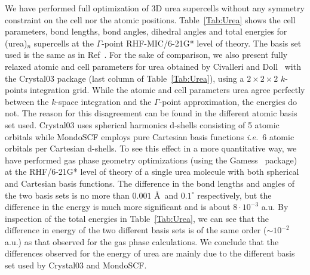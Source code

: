 \documentclass[prl,preprint,doublespace]{revtex4} %
\begin{document}
We have performed full optimization of 3D urea supercells 
without any symmetry constraint on the cell nor the atomic positions.
Table~\ref{Tab:Urea} shows the cell parameters, bond lengths, 
bond angles, dihedral angles and total energies
for (urea)$_n$ supercells at the $\Gamma$-point RHF-MIC/6-21G* level of
theory. The basis set used is the same as in Ref~\cite{RDovesi90}.
For the sake of comparison, we also present fully relaxed atomic and cell parameters
for urea obtained by Civalleri and Doll~\cite{BCivalleri05} with the 
{\sc Crystal03} package (last column of Table~\ref{Tab:Urea}), 
using a $2\times 2\times 2$ $k$-points integration grid.
While the atomic and cell parameters urea agree perfectly between the $k$-space integration
and the $\Gamma$-point approximation, the energies do not.
The reason for this disagreement can be found in the different atomic basis set used.
{\sc Crystal03} uses spherical harmonics d-shells consisting of 5 atomic orbitals 
while {\sc MondoSCF} employs pure Cartesian basis functions {\em i.e.}~6 atomic orbitals 
per Cartesian d-shells.
To see this effect in a more quantitative way, we have performed gas phase geometry optimizations 
(using the {\sc Gamess}~\cite{gamess} package) at the RHF/6-21G* level of theory 
of a single urea molecule with both spherical and Cartesian basis functions.
The difference in the bond lengths and angles of the two basis sets 
is no more than $0.001$ \AA~and $0.1^\circ$ respectively, but the
difference in the energy is much more significant and is about $8\cdot 10^{-3}$ a.u.
By inspection of the total energies in Table~\ref{Tab:Urea}, we can see that the difference
in energy of the two different basis sets is of the same order ($\sim 10^{-2}$ a.u.) 
as that observed
for the gas phase calculations. We conclude that the differences observed for the energy
of urea are mainly due to the different basis set used by {\sc Crystal03} and 
{\sc MondoSCF}.
\end{document}
